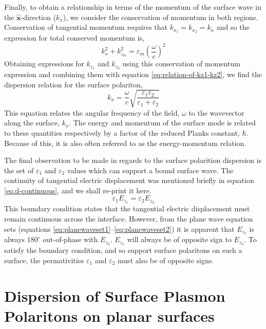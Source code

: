\documentclass[oneside,10pt,a4paper]{book}
\begin{document}
Finally, to obtain a relationship in terms of the momentum of the surface wave in the $\mathbf{\hat{x}}$-direction ($k_x$), we consider the conservation of momentum in both regions.  Conservation of tangential momentum  requires that $k_{x_1}=k_{x_2}=k_x$ and so the expression for total conserved momentum is,
\begin{equation}
k_x^2+k_{z_m}^2=\varepsilon_m\left(\frac{\omega}{c}\right)^2\label{eq:momentum-conservation}
\end{equation}
Obtaining expressions for $k_{z_1}$ and $k_{z_2}$ using this conservation of momentum expression and combining them with equation \ref{eq:relation-of-kz1-kz2}, we find the dispersion relation for the surface polariton,
\begin{equation}
k_x=\frac{\omega}{c}\sqrt{\frac{\varepsilon_1\varepsilon_2}{\varepsilon_1+\varepsilon_2}}\label{eq:dispersion}
\end{equation}
This equation relates the angular frequency of the field, $\omega$ to the wavevector along the surface, $k_x$. The energy and momentum of the surface mode is related to these quantities respectively by a factor of the reduced Planks constant, $\hbar$. Because of this, it is also often referred to as the energy-momentum relation.  

The final observation to be made in regards to the surface polarition dispersion is the set of $\varepsilon_1$ and $\varepsilon_2$ values which can support a bound surface wave. The continuity of tangential electric displacement was mentioned briefly in equation \ref{eq:d-continuous}, and we shall re-print it here.
\begin{equation*}
\varepsilon_1E_{z_1}=\varepsilon_2E_{z_2}
\end{equation*}
This boundary condition states that the tangential electric displacement must remain continuous across the interface. However, from the plane wave equation sets (equations \ref{eq:planewaveset1}--\ref{eq:planewaveset2}) it is apparent that $E_{z_1}$ is always $180^{\circ}$ out-of-phase with $E_{z_2}$. $E_{z_1}$ will always be of opposite sign to $E_{z_2}$. To satisfy the boundary condition, and so support surface polaritons on such a surface, the permativities $\varepsilon_1$ and $\varepsilon_2$ must also be of opposite signs. 

\section{Dispersion of Surface Plasmon Polaritons on planar surfaces}
\end{document}
